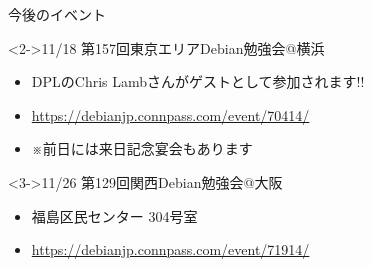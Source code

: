 \documentclass[cjk,c,squeeze,shrink,dvipdfmx,12pt]{beamer}
\begin{document}
\begin{frame}[fragile]{今後のイベント}
  \begin{block}<2->{11/18 第157回東京エリアDebian勉強会@横浜}
    \begin{itemize}
    \item \alert{DPLのChris Lambさんがゲストとして参加されます!!}
    \item \url{https://debianjp.connpass.com/event/70414/}
    \item ※前日には来日記念宴会もあります
    \end{itemize}
  \end{block}
  \vfill
  \begin{block}<3->{11/26 第129回関西Debian勉強会@大阪}
    \begin{itemize}
    \item 福島区民センター 304号室
    \item \url{https://debianjp.connpass.com/event/71914/}
    \end{itemize}
  \end{block}
  \vfill
\end{frame}

\takahashi[80]{　}
\end{document}
